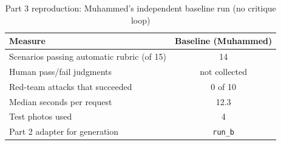 \begin{table}[!t]
\centering
\footnotesize
\setlength{\tabcolsep}{4pt}
\caption{Part 3 reproduction: Muhammed's independent baseline run (no critique loop)}
\label{tab:p3repro}
\begin{tabular}{lc}
\toprule
Measure & Baseline (Muhammed) \\
\midrule
Scenarios passing automatic rubric (of 15) & 14 \\
Human pass/fail judgments & not collected \\
Red-team attacks that succeeded & 0 of 10 \\
Median seconds per request & 12.3 \\
Test photos used & 4 \\
Part 2 adapter for generation & \texttt{run\_b} \\
\bottomrule
\end{tabular}
\end{table}
